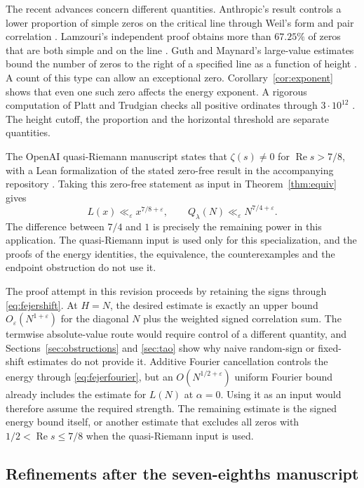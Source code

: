\documentclass[11pt]{amsart}
\theoremstyle{definition}
\theoremstyle{remark}
\newcommand{\R}{\operatorname{Re}}
\numberwithin{equation}{section}
\begin{document}
The recent advances concern different quantities. Anthropic's result controls a lower proportion of simple zeros on the critical line through Weil's form and pair correlation \cite{anthropic}. Lamzouri's independent proof obtains more than \(67.25\%\) of zeros that are both simple and on the line \cite{lamzouri}. Guth and Maynard's large-value estimates bound the number of zeros to the right of a specified line as a function of height \cite{gm}. A count of this type can allow an exceptional zero. Corollary~\ref{cor:exponent} shows that even one such zero affects the energy exponent. A rigorous computation of Platt and Trudgian checks all positive ordinates through \(3\cdot10^{12}\) \cite{pt}. The height cutoff, the proportion and the horizontal threshold are separate quantities.

The OpenAI quasi-Riemann manuscript states that \(\zeta(s)\ne0\) for \(\R s>7/8\), with a Lean formalization of the stated zero-free result in the accompanying repository \cite{oai,oaiscope}. Taking this zero-free statement as input in Theorem~\ref{thm:equiv} gives
\[
 L(x)\ll_\varepsilon x^{7/8+\varepsilon},
 \qquad Q_\lambda(N)\ll_\varepsilon N^{7/4+\varepsilon}.
\]
The difference between \(7/4\) and \(1\) is precisely the remaining power in this application. The quasi-Riemann input is used only for this specialization, and the proofs of the energy identities, the equivalence, the counterexamples and the endpoint obstruction do not use it.

The proof attempt in this revision proceeds by retaining the signs through \eqref{eq:fejershift}. At \(H=N\), the desired estimate is exactly an upper bound \(O_\varepsilon(N^{1+\varepsilon})\) for the diagonal \(N\) plus the weighted signed correlation sum. The termwise absolute-value route would require control of a different quantity, and Sections~\ref{sec:obstructions} and \ref{sec:tao} show why naive random-sign or fixed-shift estimates do not provide it. Additive Fourier cancellation controls the energy through \eqref{eq:fejerfourier}, but an \(O(N^{1/2+\varepsilon})\) uniform Fourier bound already includes the estimate for \(L(N)\) at \(\alpha=0\). Using it as an input would therefore assume the required strength. The remaining estimate is the signed energy bound itself, or another estimate that excludes all zeros with \(1/2<\R s\le7/8\) when the quasi-Riemann input is used.

\subsection{Refinements after the seven-eighths manuscript}
\end{document}
